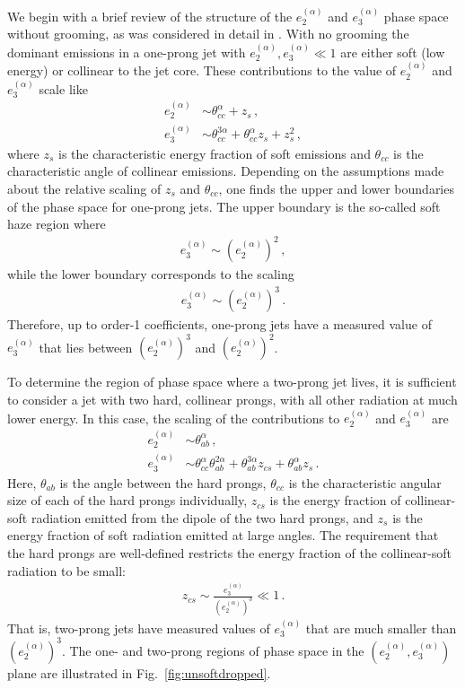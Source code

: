 \documentclass[a4paper,11pt]{article}
\newcommand{\ecf}[2]{e_{#1}^{(#2)}}
\newcommand{\nn}{\nonumber}
\DeclareRobustCommand{\Fig}[1]{Fig.~\ref{#1}}
\begin{document}
We begin with a brief review of the structure of the $\ecf{2}{\alpha}$ and $\ecf{3}{\alpha}$ phase space without grooming, as was considered in detail in \cite{Larkoski:2014gra,Larkoski:2015kga}.  With no grooming the dominant emissions in a one-prong jet with $\ecf{2}{\alpha},\ecf{3}{\alpha}\ll 1$ are either soft (low energy) or collinear to the jet core.
These contributions to the value of $\ecf{2}{\alpha}$ and $\ecf{3}{\alpha}$ scale like
\begin{align}
\ecf{2}{\alpha}&\sim \theta_{cc}^\alpha+z_s  \,,  \nn \\
\ecf{3}{\alpha}&\sim \theta_{cc}^{3\alpha}+\theta_{cc}^\alpha z_s+z_s^2 \,,
\end{align}
where $z_s$ is the characteristic energy fraction of soft emissions and $\theta_{cc}$ is the characteristic angle of collinear emissions.  Depending on the assumptions made about the relative scaling of $z_s$ and $\theta_{cc}$, one finds the upper and lower boundaries of the phase space for one-prong jets.
The upper boundary is the so-called soft haze region where
\begin{align}
\ecf{3}{\alpha}\sim (\ecf{2}{\alpha})^2\,,
\end{align}
while the lower boundary corresponds to the scaling
\begin{align}
\ecf{3}{\alpha}\sim (\ecf{2}{\alpha})^3\,.
\end{align}
Therefore, up to order-1 coefficients, one-prong jets have a measured value of $\ecf{3}{\alpha}$ that lies between $(\ecf{2}{\alpha})^3$ and $(\ecf{2}{\alpha})^2$.


To determine the region of phase space where a two-prong jet lives, it is sufficient to consider a jet with two hard, collinear prongs, with all other radiation at much lower energy.  In this case, the scaling of the contributions to $\ecf{2}{\alpha}$ and $\ecf{3}{\alpha}$ are
\begin{align}
\ecf{2}{\alpha}&\sim \theta_{ab}^\alpha\,, \nn \\
\ecf{3}{\alpha} &\sim \theta_{cc}^\alpha \theta_{ab}^{2\alpha} + \theta_{ab}^{3\alpha}z_{cs} +\theta_{ab}^{\alpha}z_s \,.
\end{align}
Here, $\theta_{ab}$ is the angle between the hard prongs, $\theta_{cc}$ is the characteristic angular size of each of the hard prongs individually, $z_{cs}$ is the energy fraction of collinear-soft radiation emitted from the dipole of the two hard prongs, and $z_s$ is the energy fraction of soft radiation emitted at large angles.  The requirement that the hard prongs are well-defined restricts the energy fraction of the collinear-soft radiation to be small:
\begin{align}
z_{cs} \sim \frac{\ecf{3}{\alpha}}{(\ecf{2}{\alpha})^3}\ll 1\,.
\end{align}
That is, two-prong jets have measured values of $\ecf{3}{\alpha}$ that are much smaller than $(\ecf{2}{\alpha})^3$.  The one- and two-prong regions of phase space in the $(\ecf{2}{\alpha},\ecf{3}{\alpha})$ plane are illustrated in \Fig{fig:unsoftdropped}.
\end{document}
